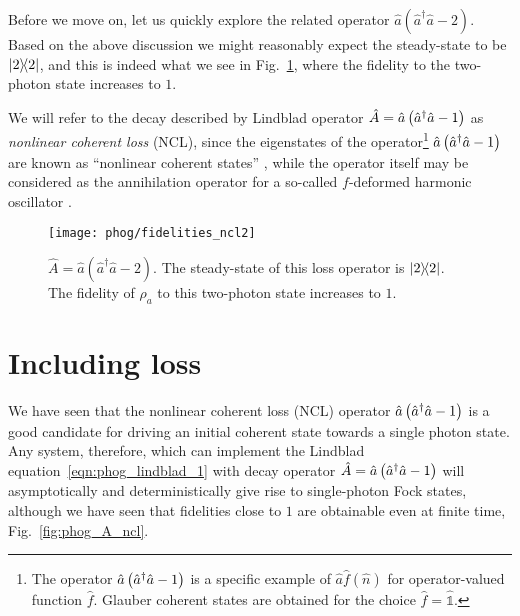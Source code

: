 Before we move on, let us quickly explore the related operator $\hat{a}\left(\hat{a}^\dagger \hat{a} -2\right)$. Based on the above discussion we might reasonably expect the steady-state to be $\dyad{2}$, and this is indeed what we see in Fig.~\ref{fig:phog_A_ncl2}, where the fidelity to the two-photon state increases to $1$. 

We will refer to the decay described by Lindblad operator $\hat{A} = \hat{a}\left(\hat{a}^\dagger \hat{a} - 1\right)$ as \emph{nonlinear coherent loss} (NCL), since the eigenstates of the operator\footnote{The operator $\hat{a}\left(\hat{a}^\dagger \hat{a} - 1\right)$ is a specific example of $\hat{a} \hat{f}\left(\hat{n}\right)$ for operator-valued function $\hat{f}$. Glauber coherent states are obtained for the choice $\hat{f} = \hat{\mathds{1}}$.}
 $\hat{a}\left(\hat{a}^\dagger \hat{a} - 1\right)$ are known as ``nonlinear coherent states'' \cite{Manko1997}, while the operator itself may be considered as the annihilation operator for a so-called $f$-deformed harmonic oscillator \cite{Filho1996}.
\begin{figure}[htp]
\captionsetup{width=\linewidth}
\centering
\texttt{[image: phog/fidelities\_ncl2]}
\caption{\label{fig:phog_A_ncl2} $\hat{A} = \hat{a}\left(\hat{a}^\dagger \hat{a} - 2\right)$. The steady-state of this loss operator is $\dyad{2}$. The fidelity of $\rho_a$ to this two-photon state increases to $1$.}
\end{figure}



\FloatBarrier
\section{Including loss}\label{sec:phog_including_loss}
We have seen that the nonlinear coherent loss (NCL) operator $\hat{a}\left(\hat{a}^\dagger \hat{a} - 1\right)$ is a good candidate for driving an initial coherent state towards a single photon state. Any system, therefore, which can implement the Lindblad equation~\ref{eqn:phog_lindblad_1} with decay operator $\hat{A} = \hat{a}\left(\hat{a}^\dagger \hat{a} - 1\right)$ will asymptotically and deterministically give rise to single-photon Fock states, although we have seen that fidelities close to $1$ are obtainable even at finite time, Fig.~\ref{fig:phog_A_ncl}. 

